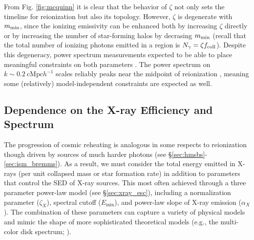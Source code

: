 From Fig. \ref{fig:mcquinn} it is clear that the behavior of $\zeta$ not only sets the timeline for reionization but also its topology. However, $\zeta$ is degenerate with $m_{\text{min}}$, since the ionizing emissivity can be enhanced both by increasing $\zeta$ directly or by increasing the number of star-forming halos by decrasing $m_{\text{min}}$ (recall that the total number of ionizing photons emitted in a region is $N_{\gamma} = \zeta f_{\text{coll}}$). Despite this degeneracy, power spectrum measurements expected to be able to place meaningful constraints on both parameters \cite{Greig2017}. The power spectrum on $k \sim 0.2 \ \mathrm{cMpc} h^{-1}$ scales reliably peaks near the midpoint of reionization \cite{Lidz2008}, meaning some (relatively) model-independent constraints are expected as well.




\subsection{Dependence on the X-ray Efficiency and Spectrum} \label{sec:dep_xray}
The progression of cosmic reheating is analogous in some respects to reionization though driven by sources of much harder photons (see \S\ref{sec:hmsbs}-\ref{sec:ism_bremms}). As a result, we must consider the total energy emitted in X-rays (per unit collapsed mass or star formation rate) in addition to parameters that control the SED of X-ray sources. This most often achieved through a three parameter power-law model (see \S\ref{sec:xray_esc}), including a normalization parameter ($\zeta_X$), spectral cutoff ($E_{\min}$), and power-law slope of X-ray emission ($\alpha_X$). The combination of these parameters can capture a variety of physical models and mimic the shape of more sophisticated theoretical models (e.g., the multi-color disk spectrum; \cite{Mitsuda1984}).

